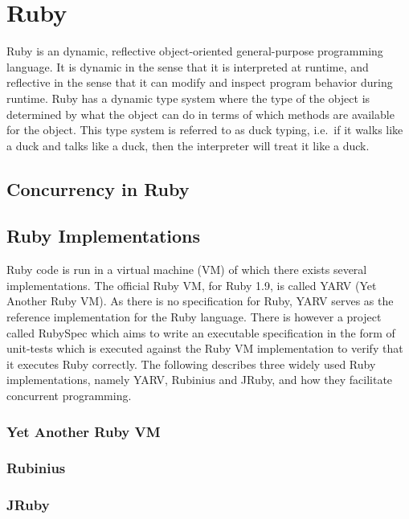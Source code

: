 \section{Ruby} %
\label{sec:ruby}

Ruby is an dynamic, reflective object-oriented general-purpose programming language. It is dynamic in the sense that it is interpreted at runtime, and reflective in the sense that it can modify and inspect program behavior during runtime. 
Ruby has a dynamic type system where the type of the object is determined by what the object can do in terms of which methods are available for the object. This type system is referred to as duck typing, i.e.\ if it walks like a duck and talks like a duck, then the interpreter will treat it like a duck.

\subsection{Concurrency in Ruby}

\subsection{Ruby Implementations}
Ruby code is run in a virtual machine (VM) of which there exists several implementations. The official Ruby VM, for Ruby 1.9, is called YARV (Yet Another Ruby VM). As there is no specification for Ruby, YARV serves as the reference implementation for the Ruby language. 
There is however a project called RubySpec which aims to write an executable specification in the form of unit-tests which is executed against the Ruby VM implementation to verify that it executes Ruby correctly. The following describes three widely used Ruby implementations, namely YARV, Rubinius and JRuby, and how they facilitate concurrent programming.

\subsubsection{Yet Another Ruby VM}

\subsubsection{Rubinius}

\subsubsection{JRuby}


